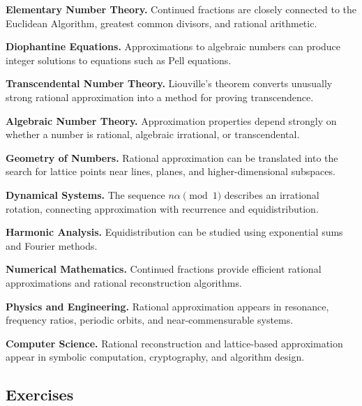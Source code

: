 \begin{applicationbox}
\textbf{Elementary Number Theory.}
Continued fractions are closely connected to the Euclidean Algorithm,
greatest common divisors, and rational arithmetic.

\medskip

\textbf{Diophantine Equations.}
Approximations to algebraic numbers can produce integer solutions to equations
such as Pell equations.

\medskip

\textbf{Transcendental Number Theory.}
Liouville's theorem converts unusually strong rational approximation into a
method for proving transcendence.

\medskip

\textbf{Algebraic Number Theory.}
Approximation properties depend strongly on whether a number is rational,
algebraic irrational, or transcendental.

\medskip

\textbf{Geometry of Numbers.}
Rational approximation can be translated into the search for lattice points
near lines, planes, and higher-dimensional subspaces.

\medskip

\textbf{Dynamical Systems.}
The sequence \(n\alpha\pmod1\) describes an irrational rotation, connecting
approximation with recurrence and equidistribution.

\medskip

\textbf{Harmonic Analysis.}
Equidistribution can be studied using exponential sums and Fourier methods.

\medskip

\textbf{Numerical Mathematics.}
Continued fractions provide efficient rational approximations and rational
reconstruction algorithms.

\medskip

\textbf{Physics and Engineering.}
Rational approximation appears in resonance, frequency ratios, periodic
orbits, and near-commensurable systems.

\medskip

\textbf{Computer Science.}
Rational reconstruction and lattice-based approximation appear in symbolic
computation, cryptography, and algorithm design.
\end{applicationbox}

\subsection{Exercises}
\label{subsec:diophantine-approximation-exercises}

